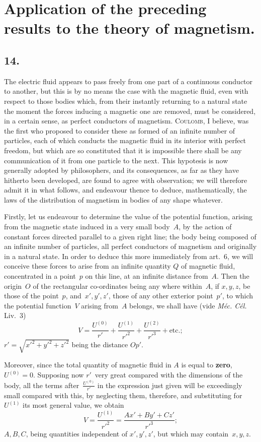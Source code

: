 \documentclass[12pt,notitlepage]{amsart}
\let\Person\textsc
\let\Emphasis\textbf
\let\Title\textit
\newcommand\Section[1]{\subsection{{#1}}}
\begin{document}
\section{Application of the preceding results to the theory of magnetism.}
\Section{14.}
The electric fluid appears to pass freely from one part of a continuous
conductor to another, but this is by no means the case with the magnetic
fluid, even with respect to those bodies which, from their instantly returning
to a natural state the moment the forces inducing a magnetic one are removed,
must be considered, in a certain sense, as perfect conductors of magnetism.
\Person{Coulomb}, I believe,
was the first who proposed to consider these as formed
of an infinite number of particles, each of which conducts the magnetic fluid
in its interior with perfect freedom, but which are so constituted that it is
impossible there shall be any communication of it from one particle to the
next. This hypotesis is now generally adopted by philosophers, and its 
consequences, as far as they have hitherto been developed, are found to agree
with observation; we will therefore admit it in what follows, and endeavour
thence to deduce, mathematically, the laws of the distribution of magnetism
in bodies of any shape whatever.

Firstly, let us endeavour to determine the value of the potential
function, arising from the magnetic state induced in a very small body~$A$, by
the action of constant forces directed parallel to a given right line; the body
being composed of an infinite number of particles, all perfect conductors of
magnetism and originally in a natural state. In order to deduce this more
immediately from art.~6, we will conceive these forces to arise from an 
infinite quantity $Q$ of magnetic fluid, concentrated
in a point~$p$ on this line, at
an infinite distance from~$A$. Then the origin~$O$ of the rectangular
co-ordinates being any where within~$A$, if $x,y,z$,
be those of the point~$p$, and~$x',y',z'$,
those of any other exterior point~$p'$, to which the potential
function~$V$ arising from~$A$ belongs, we shall have
(vide \Title{M\'ec. C\'el.} Liv.~3)
\[
V=\frac{U^{(0)}}{r'}
+\frac{U^{(1)}}{r'^2}
+\frac{U^{(2)}}{r'^3}
+\text{etc.};
\]
$r'=\sqrt{x'^2+y'^2+z'^2}$ being the distance $Op'$.

Moreover, since the total quantity of magnetic fluid in $A$ is equal to
\Emphasis{zero}, ${U^{(0)}=0}$.
Supposing now $r'$~very great compared with the dimensions of
the body, all the terms after~$\frac{U^{(0)}}{r'}$
in the expression just given will be exceedingly
small compared with this, by neglecting them, therefore, and substituting
for~$U^{(1)}$ its most general value, we obtain
\[
V=\frac{U^{(1)}}{r'^2}
=\frac{Ax'+By'+Cz'}{r'^3};
\]
$A,B,C$, being quantities independent of $x',y',z'$,
but which may contain~$x,y,z$.
\end{document}
